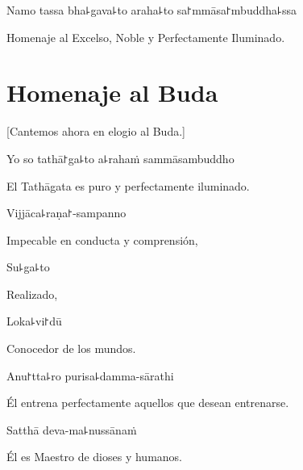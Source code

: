 \vspace{\baselineskip}

Namo tassa bha꜕gava꜕to araha꜕to sa꜓mmāsa꜓mbuddha꜕ssa


\begin{english}
  Homenaje al Excelso, Noble y Perfectamente Iluminado.

\end{english}

\clearpage

\chapter{Homenaje al Buda}

\begin{leader}
\end{leader}

\begin{english}
  [Cantemos ahora en elogio al Buda.]
\end{english}

Yo so tathā꜓ga꜕to a꜕rahaṁ sammāsambuddho

\begin{english}
  El Tathāgata es puro y perfectamente iluminado.
\end{english}

Vijjāca꜕raṇa꜓-sampanno

\begin{english}
  Impecable en conducta y comprensión,
\end{english}

Su꜕ga꜕to

\begin{english}
  Realizado,
\end{english}

Loka꜕vi꜓dū

\begin{english}
  Conocedor de los mundos.
\end{english}

Anu꜓tta꜕ro purisa꜕damma-sārathi

\begin{english}
  Él entrena perfectamente aquellos que desean entrenarse.
\end{english}

Satthā deva-ma꜕nussānaṁ

\begin{english}
  Él es Maestro de dioses y humanos.
\end{english}

